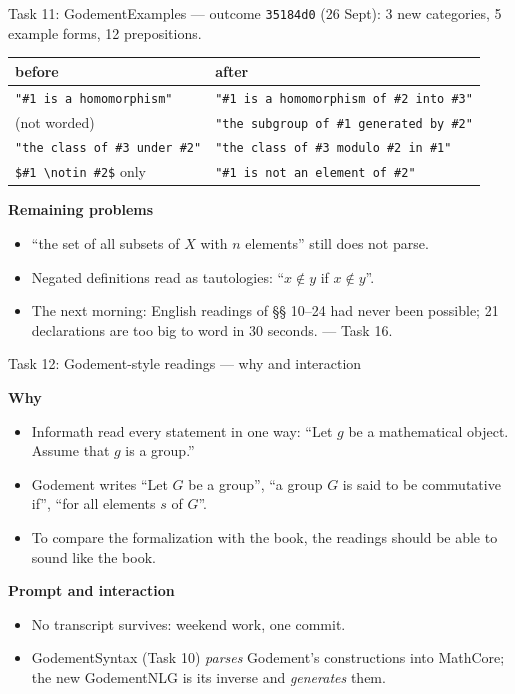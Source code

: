 \documentclass[10pt,aspectratio=169]{beamer}
\newcommand{\ok}[1]{\textcolor{good}{#1}}
\newcommand{\commit}[1]{\texttt{\footnotesize #1}}
\newcommand{\why}{\par\textcolor{gfblue}{\textbf{Why}}\par}
\newcommand{\how}{\par\textcolor{gfblue}{\textbf{Prompt and interaction}}\par}
\begin{document}
\begin{frame}{Task 11: GodementExamples --- outcome}
  \commit{35184d0} (26 Sept): 3 new categories, 5 example forms, 12 prepositions.
  \begin{center}\small
  \begin{tabular}{ll}
    \toprule
    \textbf{before} & \textbf{after} \\
    \midrule
    \texttt{"\#1 is a homomorphism"} & \texttt{"\#1 is a homomorphism of \#2 into \#3"} \\
    (not worded) & \texttt{"the subgroup of \#1 generated by \#2"} \\
    \texttt{"the class of \#3 under \#2"} & \texttt{"the class of \#3 modulo \#2 in \#1"} \\
    \texttt{\$\#1 \textbackslash notin \#2\$} only & \texttt{"\#1 is not an element of \#2"} \\
    \bottomrule
  \end{tabular}
  \end{center}
  \textbf{Remaining problems}
  \begin{itemize}\small
    \item ``the set of all subsets of $X$ with $n$ elements'' still does not parse.
    \item Negated definitions read as tautologies: ``$x \notin y$ if $x \notin y$''.
    \item The next morning: English readings of §§ 10--24 had never been possible;
          21 declarations are too big to word in 30 seconds. \ok{--- Task 16.}
  \end{itemize}
\end{frame}

\begin{frame}{Task 12: Godement-style readings --- why and interaction}
  \why
  \begin{itemize}\small
    \item Informath read every statement in one way:
          ``Let $g$ be a mathematical object. Assume that $g$ is a group.''
    \item Godement writes ``Let $G$ be a group'', ``a group $G$ is said to be
          commutative if'', ``for all elements $s$ of $G$''.
    \item To compare the formalization with the book, the readings should be
          able to sound like the book.
  \end{itemize}
  \how
  \begin{itemize}\small
    \item No transcript survives: weekend work, one commit.
    \item GodementSyntax (Task 10) \emph{parses} Godement's constructions into
          MathCore; the new GodementNLG is its inverse and \emph{generates} them.
  \end{itemize}
\end{frame}
\end{document}
